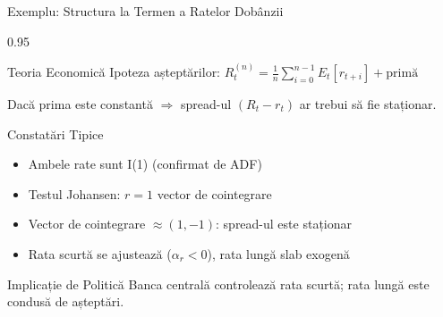 \documentclass[9pt, aspectratio=169, t]{beamer}
\begin{document}
\begin{frame}{Exemplu: Structura la Termen a Ratelor Dobânzii}
    \begin{cminipage}{0.95\textwidth}
    {\small
    \begin{block}{Teoria Economică}
        Ipoteza așteptărilor: $R_t^{(n)} = \frac{1}{n}\sum_{i=0}^{n-1} E_t[r_{t+i}] + \text{primă}$

        Dacă prima este constantă $\Rightarrow$ spread-ul $(R_t - r_t)$ ar trebui să fie staționar.
    \end{block}
    \begin{exampleblock}{Constatări Tipice}
        \begin{itemize}\setlength{\itemsep}{0pt}
            \item Ambele rate sunt I(1) (confirmat de ADF)
            \item Testul Johansen: $r = 1$ vector de cointegrare
            \item Vector de cointegrare $\approx (1, -1)$: spread-ul este staționar
            \item Rata scurtă se ajustează ($\alpha_r < 0$), rata lungă slab exogenă
        \end{itemize}
    \end{exampleblock}
    \begin{block}{Implicație de Politică}
        Banca centrală controlează rata scurtă; rata lungă este condusă de așteptări.
    \end{block}
    }
    \end{cminipage}
\end{frame}
\end{document}
